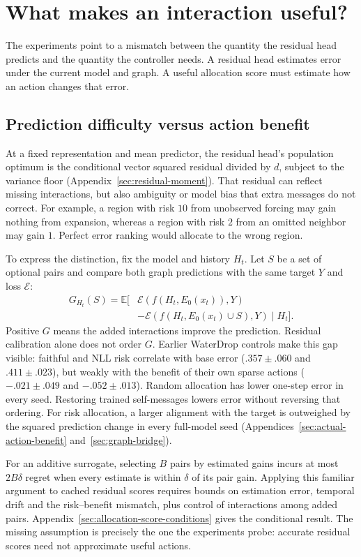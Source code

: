 \section{What makes an interaction useful?}
The experiments point to a mismatch between the quantity the residual head predicts and the quantity the controller needs. A residual head estimates error under the current model and graph. A useful allocation score must estimate how an action changes that error.

\subsection{Prediction difficulty versus action benefit}
At a fixed representation and mean predictor, the residual head's population optimum is the conditional vector squared residual divided by $d$, subject to the variance floor (Appendix~\ref{sec:residual-moment}). That residual can reflect missing interactions, but also ambiguity or model bias that extra messages do not correct. For example, a region with risk $10$ from unobserved forcing may gain nothing from expansion, whereas a region with risk $2$ from an omitted neighbor may gain $1$. Perfect error ranking would allocate to the wrong region.

To express the distinction, fix the model and history $H_t$. Let $S$ be a set of optional pairs and compare both graph predictions with the same target $Y$ and loss $\mathcal E$:
\begin{align}
 G_{H_t}(S)=\mathbb E[&\mathcal E(f(H_t,E_0(x_t)),Y)\nonumber\\
              &-\mathcal E(f(H_t,E_0(x_t)\cup S),Y)\mid H_t].
\end{align}
Positive $G$ means the added interactions improve the prediction. Residual calibration alone does not order $G$. Earlier WaterDrop controls make this gap visible: faithful and NLL risk correlate with base error ($.357\pm.060$ and $.411\pm.023$), but weakly with the benefit of their own sparse actions ($-.021\pm.049$ and $-.052\pm.013$). Random allocation has lower one-step error in every seed. Restoring trained self-messages lowers error without reversing that ordering. For risk allocation, a larger alignment with the target is outweighed by the squared prediction change in every full-model seed (Appendices~\ref{sec:actual-action-benefit} and~\ref{sec:graph-bridge}).

For an additive surrogate, selecting $B$ pairs by estimated gains incurs at most $2B\delta$ regret when every estimate is within $\delta$ of its pair gain. Applying this familiar argument to cached residual scores requires bounds on estimation error, temporal drift and the risk--benefit mismatch, plus control of interactions among added pairs. Appendix~\ref{sec:allocation-score-conditions} gives the conditional result. The missing assumption is precisely the one the experiments probe: accurate residual scores need not approximate useful actions.

